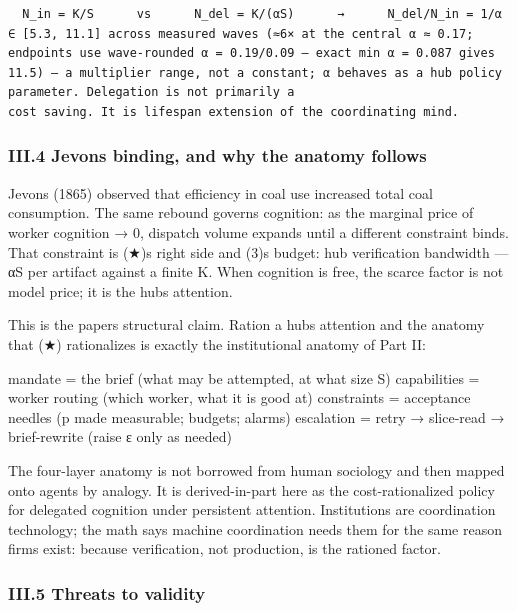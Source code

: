 \documentclass[
]{article}
\begin{document}
\begin{verbatim}
  N_in = K/S      vs      N_del = K/(αS)      →      N_del/N_in = 1/α ∈ [5.3, 11.1] across measured waves (≈6× at the central α ≈ 0.17; endpoints use wave-rounded α = 0.19/0.09 — exact min α = 0.087 gives 11.5) — a multiplier range, not a constant; α behaves as a hub policy parameter. Delegation is not primarily a
cost saving. It is lifespan extension of the coordinating mind.
\end{verbatim}

\subsubsection{III.4 Jevons binding, and why the anatomy
follows}\label{iii4-jevons-binding-and-why-the-anatomy-follows}

Jevons (1865) observed that efficiency in coal use increased total coal
consumption. The same rebound governs cognition: as the marginal price
of worker cognition → 0, dispatch volume expands until a different
constraint binds. That constraint is (★)\textquotesingle s right side
and (3)\textquotesingle s budget: hub verification bandwidth --- αS per
artifact against a finite K. When cognition is free, the scarce factor
is not model price; it is the hub\textquotesingle s attention.

This is the paper\textquotesingle s structural claim. Ration a
hub\textquotesingle s attention and the anatomy that (★) rationalizes is
exactly the institutional anatomy of Part II:

mandate = the brief (what may be attempted, at what size S) capabilities
= worker routing (which worker, what it is good at) constraints =
acceptance needles (p made measurable; budgets; alarms) escalation =
retry → slice-read → brief-rewrite (raise ε only as needed)

The four-layer anatomy is not borrowed from human sociology and then
mapped onto agents by analogy. It is derived-in-part here as the
cost-rationalized policy for delegated cognition under persistent
attention. Institutions are coordination technology; the math says
machine coordination needs them for the same reason firms exist: because
verification, not production, is the rationed factor.

\subsubsection{III.5 Threats to
validity}\label{iii5-threats-to-validity}
\end{document}
